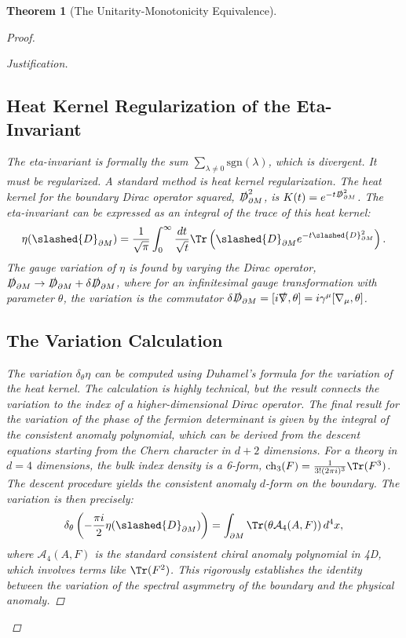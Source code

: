 \documentclass[11pt, letterpaper]{report}
\theoremstyle{plain} %
\newtheorem{theorem}{Theorem}[chapter]
\theoremstyle{definition} %
\theoremstyle{remark} %
\newcommand{\BulkM}{M}
\newcommand{\BoundaryM}{\partial\BulkM}
\newcommand{\DiracOpBoundary}{\slashed{D}_{\BoundaryM}}
\newcommand{\EtaInv}{\eta}
\begin{document}
\begin{theorem}[The Unitarity-Monotonicity Equivalence]
\begin{proof}
\begin{proof}[Justification]
\subsection{Heat Kernel Regularization of the Eta-Invariant}
The eta-invariant is formally the sum $\sum_{\lambda \neq 0} \text{sgn}(\lambda)$, which is divergent. It must be regularized. A standard method is heat kernel regularization. The heat kernel for the boundary Dirac operator squared, $\DiracOpBoundary^2$, is $K(t) = e^{-t\DiracOpBoundary^2}$. The eta-invariant can be expressed as an integral of the trace of this heat kernel:
\begin{equation}
    \EtaInv(\DiracOpBoundary) = \frac{1}{\sqrt{\pi}} \int_0^\infty \frac{dt}{\sqrt{t}} \Tr\left(\DiracOpBoundary e^{-t\DiracOpBoundary^2}\right).
\end{equation}
The gauge variation of $\EtaInv$ is found by varying the Dirac operator, $\DiracOpBoundary \to \DiracOpBoundary + \delta\DiracOpBoundary$, where for an infinitesimal gauge transformation with parameter $\theta$, the variation is the commutator $\delta\DiracOpBoundary = [i\slashed{\nabla}, \theta] = i\gamma^\mu[\nabla_\mu, \theta]$.

\subsection{The Variation Calculation}
The variation $\delta_\theta \EtaInv$ can be computed using Duhamel's formula for the variation of the heat kernel. The calculation is highly technical, but the result connects the variation to the index of a higher-dimensional Dirac operator. The final result for the variation of the phase of the fermion determinant is given by the integral of the consistent anomaly polynomial, which can be derived from the descent equations starting from the Chern character in $d+2$ dimensions. For a theory in $d=4$ dimensions, the bulk index density is a 6-form, $\text{ch}_3(F) = \frac{1}{3!(2\pi i)^3}\Tr(F^3)$. The descent procedure yields the consistent anomaly $d$-form on the boundary. The variation is then precisely:
\begin{equation}
    \delta_\theta \left( -\frac{\pi i}{2} \EtaInv(\DiracOpBoundary) \right) = \int_{\BoundaryM} \Tr(\theta \mathcal{A}_4(A,F)) \, d^4x,
\end{equation}
where $\mathcal{A}_4(A,F)$ is the standard consistent chiral anomaly polynomial in 4D, which involves terms like $\Tr(F^2)$. This rigorously establishes the identity between the variation of the spectral asymmetry of the boundary and the physical anomaly.


\end{proof}
\end{proof}
\end{theorem}
\end{document}
